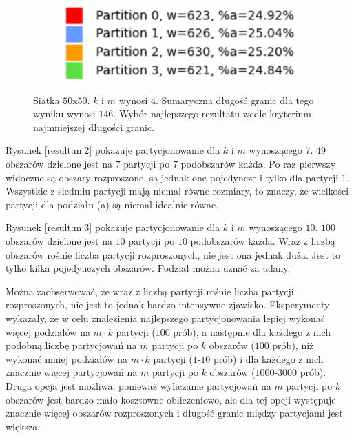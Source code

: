 \begin{figure}[h]
\begin{subfigure}{.33\textwidth}
    \caption[short]{}
\end{subfigure}
\begin{subfigure}{.33\textwidth}
    \centering
    \includegraphics[width=0.9\linewidth]{images/results/m/1/results}
    \caption[short]{}
\end{subfigure}
\caption{Siatka $50$x$50$. $k$ i $m$ wynosi $4$.
Sumaryczna długość granic dla tego wyniku wynosi $146$.
Wybór najlepszego rezultatu wedle kryterium najmniejszej długości granic.}
\label{result:m:1}
\end{figure}

Rysunek \ref{result:m:2} pokazuje partycjonowanie dla $k$ i $m$ wynoszącego $7$.
$49$ obszarów dzielone jest na $7$ partycji po $7$ podobszarów każda.
Po raz pierwszy widoczne są obszary rozproszone, są jednak one pojedyncze i tylko dla partycji $1$.
Wszystkie z siedmiu partycji mają niemal równe rozmiary, to znaczy, że wielkości partycji dla podziału (a) są
niemal idealnie równe.

Rysunek \ref{result:m:3} pokazuje partycjonowanie dla $k$ i $m$ wynoszącego $10$.
$100$ obszarów dzielone jest na $10$ partycji po $10$ podobszarów każda.
Wraz z liczbą obszarów rośnie liczba partycji rozproszonych, nie jest ona jednak duża.
Jest to tylko kilka pojedynczych obszarów.
Podział można uznać za udany.

Można zaobserwować, że wraz z liczbą partycji rośnie liczba partycji rozproszonych, nie jest to jednak bardzo intensywne
zjawisko.
Eksperymenty wykazały, że w celu znalezienia najlepszego partycjonowania lepiej wykonać więcej
podziałów na $m \cdot k$ partycji ($100$ prób), a następnie
dla każdego z nich podobną liczbę partycjowań na $m$ partycji po $k$ obszarów ($100$ prób),
niż wykonać mniej podziałów na $m \cdot k$ partycji ($1$-$10$ prób) i dla każdego
z nich znacznie więcej partycjowań na $m$ partycji po $k$ obszarów ($1000$-$3000$ prób).
Druga opcja jest możliwa, ponieważ wyliczanie partycjowań na $m$ partycji po $k$ obszarów jest bardzo mało kosztowne
obliczeniowo, ale dla tej opcji występuje znacznie więcej obszarów rozproszonych i długość granic między partycjami
jest większa.


